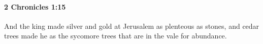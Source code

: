 
		\paragraph{2 Chronicles 1:15} %
			\label{2CHRONICLES-1-15}

			And the king made silver and gold at Jerusalem as plenteous as stones, and cedar trees made he as the sycomore trees that are in the vale for abundance.



